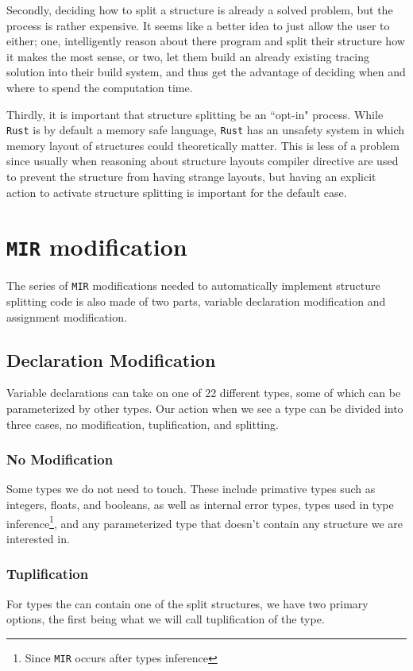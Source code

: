 \documentclass[12pt,oneside]{book}
\newcommand{\rustname}{{\texttt{Rust}}}
\def \rust {\rustname{}\xspace}
\newcommand{\mirname}{{\texttt{MIR}}}
\def \mir {\mirname{}\xspace}
\begin{document}
Secondly, deciding how to split a structure is already a solved problem,
but the process is rather expensive. It seems like a better idea to just allow the user to either; one, 
intelligently reason about there program and split their structure how it makes the most sense, or two, 
let them build an already existing tracing solution into their build system, and thus get the advantage
of deciding when and where to spend the computation time.

Thirdly, it is important that structure splitting be an ``opt-in" process.
While \rust is by default a memory safe language, \rust has an
unsafety system in which memory layout of structures could theoretically matter.
This is less of a problem since usually when reasoning about structure layouts
compiler directive are used to prevent the structure from having strange
layouts, but having an explicit action to activate structure
splitting is important for the default case. 

\section{\mir modification}

The series of \mir modifications needed to automatically implement structure
splitting code is also made of two parts, variable declaration modification and
assignment modification.

\subsection{Declaration Modification}

Variable declarations can take on one of 22 different types, some of which can
be parameterized by other types. Our action when we see a type can be divided
into three cases, no modification, tuplification, and splitting.

\subsubsection{No Modification}
Some types we do not need to touch. These include primative types such as
integers, floats, and booleans, as well as internal error types, types used in
type inference\footnote{Since \mir occurs after types inference}, and any
parameterized type that doesn't contain any structure we are interested in.

\subsubsection{Tuplification}
For types the can contain one of the split structures, we have two primary
options, the first being what we will call tuplification of the type.
\end{document}
